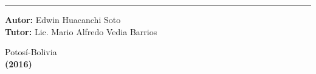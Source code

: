 \documentclass[12pt,letterpaper]{article}
\begin{document}
\begin{titlepage}
\begin{center}
\begin{large}
				\rule{20mm}{0.1mm}
				
			\end{large}
			
			\vspace*{0.3in}
			
			\vspace*{0.1in}
			
		\end{center}
		
		\begin{flushleft}
			
			{\bf Autor:} Edwin Huacanchi Soto\\
			
			{\bf Tutor:} Lic. Mario Alfredo Vedia Barrios\\
			
		\end{flushleft}
		
		\begin{center}
			
			\begin{large}
				
				\vspace*{0.50in}
				
				Potosí-Bolivia\\
				
				{\bf (2016)}
				
			\end{large}
			
		\end{center}
		
	\end{titlepage}
	
\end{document}
